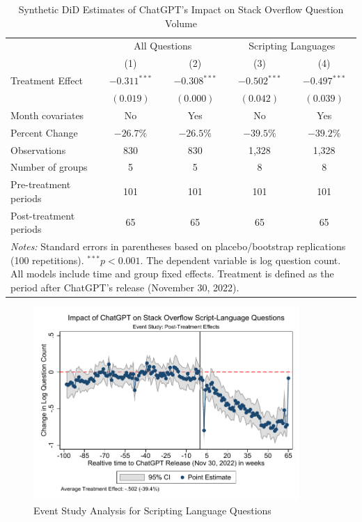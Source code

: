 \begin{table}[htpb!]
    \centering
    \caption{Synthetic DiD Estimates of ChatGPT's Impact on Stack Overflow Question Volume}
    \label{tab:app-sdid_results}
    \begin{tabular}{lcccc}
        \toprule
            & \multicolumn{2}{c}{All Questions} & \multicolumn{2}{c}{Scripting Languages} \\
            \cmidrule(lr){2-3} \cmidrule(lr){4-5}
            & (1) & (2) & (3) & (4) \\
        \midrule
            Treatment Effect & $-0.311^{***}$ & $-0.308^{***}$ & $-0.502^{***}$ & $-0.497^{***}$ \\
            & $(0.019)$ & $(0.000)$ & $(0.042)$ & $(0.039)$ \\
        \midrule
            Month covariates & No & Yes & No & Yes \\
            Percent Change & $-26.7\%$ & $-26.5\%$ & $-39.5\%$ & $-39.2\%$ \\
        \midrule
            Observations & 830 & 830 & 1,328 & 1,328 \\
            Number of groups & 5 & 5 & 8 & 8 \\
            Pre-treatment periods & 101 & 101 & 101 & 101 \\
            Post-treatment periods & 65 & 65 & 65 & 65 \\
        \bottomrule
            \multicolumn{5}{p{0.95\linewidth}}{\footnotesize \textit{Notes:} Standard errors in parentheses based on placebo/bootstrap replications (100 repetitions). $^{***}p<0.001$. The dependent variable is log question count. All models include time and group fixed effects. Treatment is defined as the period after ChatGPT's release (November 30, 2022).} \\
    \end{tabular}
\end{table}

\begin{figure}[H]
    \centering
    \includegraphics[width=0.9\textwidth]{imgs/stata/event_study_scripting_languages.pdf}
    \caption{Event Study Analysis for Scripting Language Questions}
    \label{fig:app-event_study}
\end{figure}

